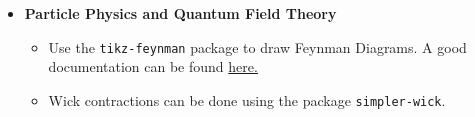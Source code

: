 \begin{itemize}
\begin{itemize}
		\item Define a few helper commands for solar mass and other units. There is probably a package for this but this is pretty easy to do by hand.
	\end{itemize}
	\item \textbf{Particle Physics and Quantum Field Theory}
	\begin{itemize}
		\item Use the \texttt{tikz-feynman} package to draw Feynman Diagrams. A good documentation can be found \href{https://in.mirrors.cicku.me/ctan/graphics/pgf/contrib/tikz-feynman/tikz-feynman.pdf}{here.}
		\item Wick contractions can be done using the package \verb*|simpler-wick|.
	\end{itemize}
\end{itemize}

